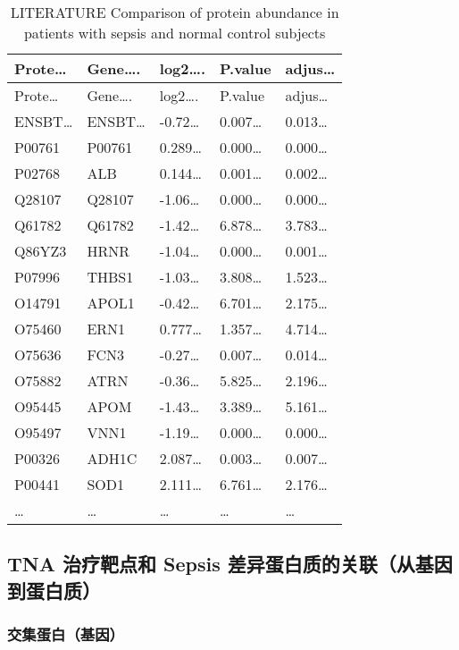\documentclass[
]{article}
\begin{document}
\begin{longtable}[]{@{}lllll@{}}
\caption{\label{tab:LITERATURE-Comparison-of-protein-abundance-in-patients-with-sepsis-and-normal-control-subjects}LITERATURE Comparison of protein abundance in patients with sepsis and normal control subjects}\tabularnewline
\toprule
Prote\ldots{} & Gene\ldots. & log2\ldots. & P.value & adjus\ldots{}\tabularnewline
\midrule
\endfirsthead
\toprule
Prote\ldots{} & Gene\ldots. & log2\ldots. & P.value & adjus\ldots{}\tabularnewline
\midrule
\endhead
ENSBT\ldots{} & ENSBT\ldots{} & -0.72\ldots{} & 0.007\ldots{} & 0.013\ldots{}\tabularnewline
P00761 & P00761 & 0.289\ldots{} & 0.000\ldots{} & 0.000\ldots{}\tabularnewline
P02768 & ALB & 0.144\ldots{} & 0.001\ldots{} & 0.002\ldots{}\tabularnewline
Q28107 & Q28107 & -1.06\ldots{} & 0.000\ldots{} & 0.000\ldots{}\tabularnewline
Q61782 & Q61782 & -1.42\ldots{} & 6.878\ldots{} & 3.783\ldots{}\tabularnewline
Q86YZ3 & HRNR & -1.04\ldots{} & 0.000\ldots{} & 0.001\ldots{}\tabularnewline
P07996 & THBS1 & -1.03\ldots{} & 3.808\ldots{} & 1.523\ldots{}\tabularnewline
O14791 & APOL1 & -0.42\ldots{} & 6.701\ldots{} & 2.175\ldots{}\tabularnewline
O75460 & ERN1 & 0.777\ldots{} & 1.357\ldots{} & 4.714\ldots{}\tabularnewline
O75636 & FCN3 & -0.27\ldots{} & 0.007\ldots{} & 0.014\ldots{}\tabularnewline
O75882 & ATRN & -0.36\ldots{} & 5.825\ldots{} & 2.196\ldots{}\tabularnewline
O95445 & APOM & -1.43\ldots{} & 3.389\ldots{} & 5.161\ldots{}\tabularnewline
O95497 & VNN1 & -1.19\ldots{} & 0.000\ldots{} & 0.000\ldots{}\tabularnewline
P00326 & ADH1C & 2.087\ldots{} & 0.003\ldots{} & 0.007\ldots{}\tabularnewline
P00441 & SOD1 & 2.111\ldots{} & 6.761\ldots{} & 2.176\ldots{}\tabularnewline
\ldots{} & \ldots{} & \ldots{} & \ldots{} & \ldots{}\tabularnewline
\bottomrule
\end{longtable}

\hypertarget{tna-ux6cbbux7597ux9776ux70b9ux548c-sepsis-ux5deeux5f02ux86cbux767dux8d28ux7684ux5173ux8054ux4eceux57faux56e0ux5230ux86cbux767dux8d28}{%
\subsection{TNA 治疗靶点和 Sepsis 差异蛋白质的关联（从基因到蛋白质）}\label{tna-ux6cbbux7597ux9776ux70b9ux548c-sepsis-ux5deeux5f02ux86cbux767dux8d28ux7684ux5173ux8054ux4eceux57faux56e0ux5230ux86cbux767dux8d28}}

\hypertarget{ux4ea4ux96c6ux86cbux767dux57faux56e0}{%
\subsubsection{交集蛋白（基因）}\label{ux4ea4ux96c6ux86cbux767dux57faux56e0}}
\end{document}
